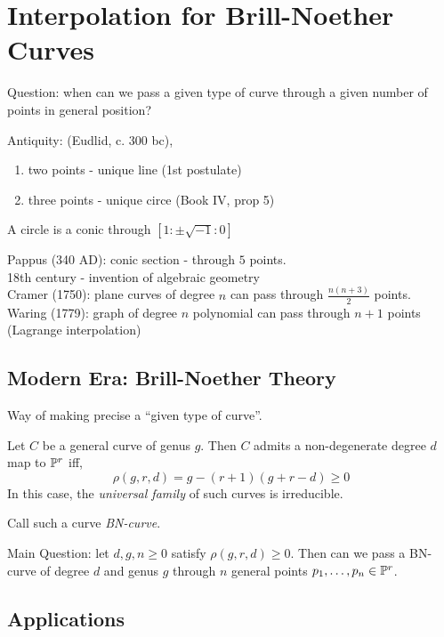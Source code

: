 \documentclass[12pt]{article}
\begin{document}
\section{Interpolation for Brill-Noether Curves}

Question: when can we pass a given type of curve through a given number of points in general position? 

Antiquity: (Eudlid, c. 300 bc),
\begin{enumerate}
\item two points - unique line (1st postulate)
\item three points - unique circe (Book IV, prop 5)
\end{enumerate}

\begin{defn}
A circle is a conic through $[1 : \pm \sqrt{-1} : 0]$ 
\end{defn}

Pappus (340 AD): conic section - through $5$ points.
\\
18th century - invention of algebraic geometry 
\\
Cramer (1750): plane curves of degree $n$ can pass through $\frac{n(n+3)}{2}$ points. 
\\
Waring (1779): graph of degree $n$ polynomial can pass through $n+1$ points (Lagrange interpolation)

\subsection{Modern Era: Brill-Noether Theory}

Way of making precise a ``given type of curve''.

\begin{theorem}
Let $C$ be a general curve of genus $g$. Then $C$ admits a non-degenerate degree $d$ map to $\P^r$ iff,
\[ \rho(g,r,d) = g - (r+1)(g+r-d) \ge 0 \]
In this case, the \textit{universal family} of such curves is irreducible.
\end{theorem}

\begin{defn}
Call such a curve \textit{BN-curve}. 
\end{defn}


Main Question: let $d,g,n \ge 0$ satisfy $\rho(g,r,d) \ge 0$. Then can we pass a BN-curve of degree $d$ and genus $g$ through $n$ general points $p_1, \dots, p_n \in \P^r$. 

\subsection{Applications}
\end{document}
